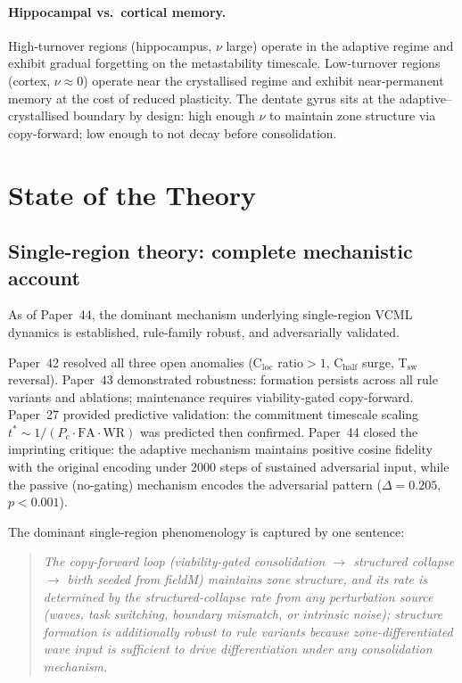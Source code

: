 \documentclass[11pt]{article}
\begin{document}
\paragraph{Hippocampal vs.\ cortical memory.}
High-turnover regions (hippocampus, $\nu$ large) operate in the adaptive regime and
exhibit gradual forgetting on the metastability timescale.
Low-turnover regions (cortex, $\nu \approx 0$) operate near the crystallised regime and
exhibit near-permanent memory at the cost of reduced plasticity.
The dentate gyrus sits at the adaptive--crystallised boundary by design: high enough $\nu$
to maintain zone structure via copy-forward; low enough to not decay before consolidation.

\section{State of the Theory}

\subsection{Single-region theory: complete mechanistic account}

As of Paper~44, the dominant mechanism underlying single-region VCML dynamics is
established, rule-family robust, and adversarially validated.

Paper~42 resolved all three open anomalies (C$_\mathrm{loc}$ ratio$>1$, C$_\mathrm{half}$
surge, T$_\mathrm{sw}$ reversal).
Paper~43 demonstrated robustness: formation persists across all rule variants and ablations;
maintenance requires viability-gated copy-forward.
Paper~27 provided predictive validation: the commitment timescale scaling
$t^* \sim 1/(P_c \cdot \mathrm{FA} \cdot \mathrm{WR})$ was predicted then confirmed.
Paper~44 closed the imprinting critique: the adaptive mechanism maintains positive cosine
fidelity with the original encoding under 2000 steps of sustained adversarial input,
while the passive (no-gating) mechanism encodes the adversarial pattern
($\Delta = 0.205$, $p < 0.001$).

The dominant single-region phenomenology is captured by one sentence:

\begin{quote}
\textit{The copy-forward loop (viability-gated consolidation $\to$ structured collapse $\to$
birth seeded from fieldM) maintains zone structure, and its rate is determined by the
structured-collapse rate from any perturbation source (waves, task switching, boundary
mismatch, or intrinsic noise); structure formation is additionally robust to rule variants
because zone-differentiated wave input is sufficient to drive differentiation under any
consolidation mechanism.}
\end{quote}
\end{document}
